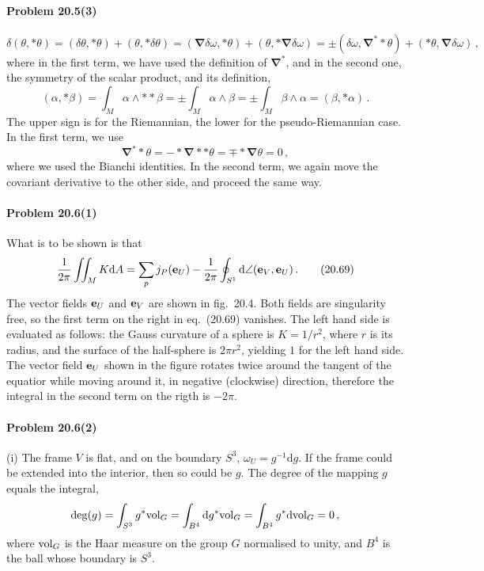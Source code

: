 \documentclass[a4paper,12pt]{article}
\def\d{\mathrm{d}}
\newcommand{\problem}[1]{\paragraph{Problem #1}}
\begin{document}

\problem{20.5(3)}
\[
\delta (\theta, *\theta) = (\delta\theta, *\theta) + (\theta, *\delta\theta) = (\boldsymbol\nabla\delta\omega, *\theta) + (\theta, *\boldsymbol\nabla\delta\omega) = \pm(\delta\omega, \boldsymbol\nabla^* *\theta) + (\boldsymbol{*}\theta, \boldsymbol\nabla\delta\omega)\,,
\]
where in the first term, we have used the definition of $\boldsymbol\nabla^*$, and in the second one, the symmetry of the scalar product, and its definition,
\[
 (\alpha, *\beta) = \int_M \alpha \wedge **\beta = \pm \int_M \alpha \wedge \beta = \pm \int_M \beta \wedge \alpha = (\beta, *\alpha)\,.
\]
The upper sign is for the Riemannian, the lower for the pseudo-Riemannian case. In the first term, we use
\[
 \boldsymbol\nabla^* *\theta = -*\boldsymbol\nabla **\theta = \mp *\boldsymbol\nabla\theta = 0\,,
\]
where we used the Bianchi identities. In the second term, we again move the covariant derivative to the other side, and proceed the same way.


\problem{20.6(1)} What is to be shown is that
\[
 \frac{1}{2\pi}\iint_M K\d A = \sum_p j_P({\bf e}_U)-\frac{1}{2\pi}\oint_{S^1}\d\angle({\bf e}_V, {\bf e}_U)\,.\tag{20.69}
\]
The vector fields ${\bf e}_U$ and ${\bf e}_V$ are shown in fig.\ 20.4. Both fields are singularity free, so the first term on the right in eq.\ (20.69) vanishes. The left hand side is evaluated as follows: the Gauss curvature of a sphere is $K=1/r^2$, where $r$ is its radius, and the surface of the half-sphere is $2\pi r^2$, yielding $1$ for the left hand side. The vector field ${\bf e}_U$ shown in the figure rotates twice around the tangent of the equatior while moving around it, in negative (clockwise) direction, therefore the integral in the second term on the rigth is $-2\pi$.


\problem{20.6(2)} (i) The frame $V$ is flat, and on the boundary $S^3$, $\omega_U = g^{-1}\d g$. If the frame could be extended into the interior, then so could be $g$. The degree of the mapping $g$ equals the integral,
\[
 {\rm deg}(g) = \int_{S^3} g^* {\rm vol}_G = \int_{B^4}\d g^* {\rm vol}_G = \int_{B^4} g^* \d{\rm vol}_G =0\,,
\]
where ${\rm vol}_G$ is the Haar measure on the group $G$ normalised to unity, and $B^4$ is the ball whose boundary is $S^3$.
\end{document}
